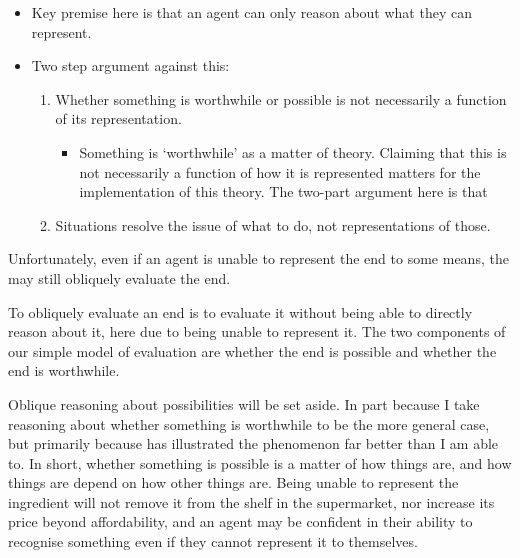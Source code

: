 \documentclass[10pt]{article}
\begin{document}
\begin{itemize}
\item Key premise here is that an agent can only reason about what they can represent.
\item Two step argument against this:
  \begin{enumerate}
  \item Whether something is worthwhile or possible is not necessarily a function of its representation.
    \begin{itemize}
    \item Something is `worthwhile' as a matter of theory.
      Claiming that this is not necessarily a function of how it is represented matters for the implementation of this theory.
      The two-part argument here is that

    \end{itemize}
  \item Situations resolve the issue of what to do, not representations of those.
  \end{enumerate}
\end{itemize}




Unfortunately, even if an agent is unable to represent the end to some means, the may still obliquely evaluate the end.

To obliquely evaluate an end is to evaluate it without being able to directly reason about it, here due to being unable to represent it.
The two components of our simple model of evaluation are whether the end is possible and whether the end is worthwhile.

Oblique reasoning about possibilities will be set aside.
In part because I take reasoning about whether something is worthwhile to be the more general case, but primarily because \textcite{Perry:1997aa} has illustrated the phenomenon far better than I am able to.
In short, whether something is possible is a matter of how things are, and how things are depend on how other things are.
Being unable to represent the ingredient will not remove it from the shelf in the supermarket, nor increase its price beyond affordability, and an agent may be confident in their ability to recognise something even if they cannot represent it to themselves.
\end{document}
